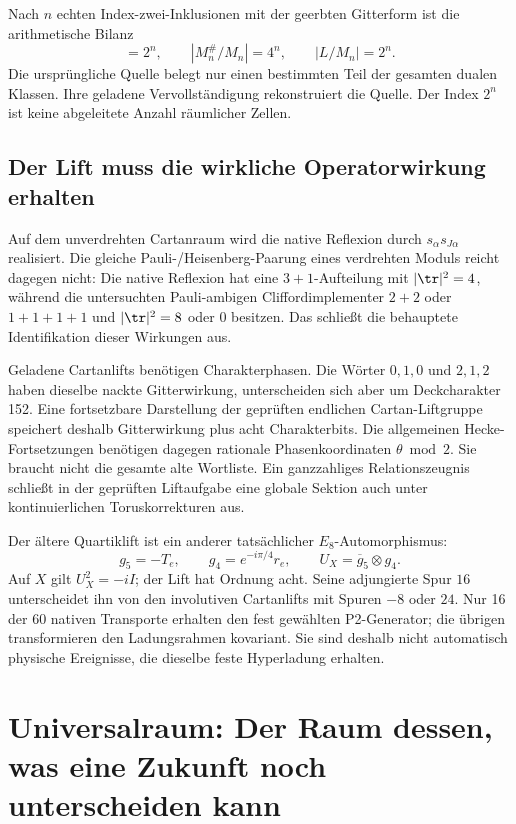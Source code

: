 Nach $n$ echten Index-zwei-Inklusionen mit der geerbten Gitterform ist die arithmetische Bilanz
\begin{equation}
[L:M_n]=2^n,\qquad |M_n^\#/M_n|=4^n,\qquad |L/M_n|=2^n.
\end{equation}
Die ursprüngliche Quelle belegt nur einen bestimmten Teil der gesamten dualen Klassen. Ihre geladene Vervollständigung rekonstruiert die Quelle. Der Index $2^n$ ist keine abgeleitete Anzahl räumlicher Zellen.

\subsection{Der Lift muss die wirkliche Operatorwirkung erhalten}
Auf dem unverdrehten Cartanraum wird die native Reflexion durch $s_\alpha s_{J\alpha}$ realisiert. Die gleiche Pauli-/Heisenberg-Paarung eines verdrehten Moduls reicht dagegen nicht: Die native Reflexion hat eine $3+1$-Aufteilung mit $|\tr|^2=4$, während die untersuchten Pauli-ambigen Cliffordimplementer $2+2$ oder $1+1+1+1$ und $|\tr|^2=8$ oder $0$ besitzen. Das schließt die behauptete Identifikation dieser Wirkungen aus.

Geladene Cartanlifts benötigen Charakterphasen. Die Wörter $0,1,0$ und $2,1,2$ haben dieselbe nackte Gitterwirkung, unterscheiden sich aber um Deckcharakter 152. Eine fortsetzbare Darstellung der geprüften endlichen Cartan-Liftgruppe speichert deshalb Gitterwirkung plus acht Charakterbits. Die allgemeinen Hecke-Fortsetzungen benötigen dagegen rationale Phasenkoordinaten $\theta\bmod2$. Sie braucht nicht die gesamte alte Wortliste. Ein ganzzahliges Relationszeugnis schließt in der geprüften Liftaufgabe eine globale Sektion auch unter kontinuierlichen Toruskorrekturen aus.

Der ältere Quartiklift ist ein anderer tatsächlicher $E_8$-Automorphismus:
\begin{equation}
g_5=-T_e,\qquad g_4=e^{-i\pi/4}r_e,
\qquad U_X=\overline g_5\otimes g_4.
\end{equation}
Auf $X$ gilt $U_X^2=-iI$; der Lift hat Ordnung acht. Seine adjungierte Spur $16$ unterscheidet ihn von den involutiven Cartanlifts mit Spuren $-8$ oder $24$. Nur 16 der 60 nativen Transporte erhalten den fest gewählten P2-Generator; die übrigen transformieren den Ladungsrahmen kovariant. Sie sind deshalb nicht automatisch physische Ereignisse, die dieselbe feste Hyperladung erhalten.

\section{Universalraum: Der Raum dessen, was eine Zukunft noch unterscheiden kann}\label{sec:universal}

